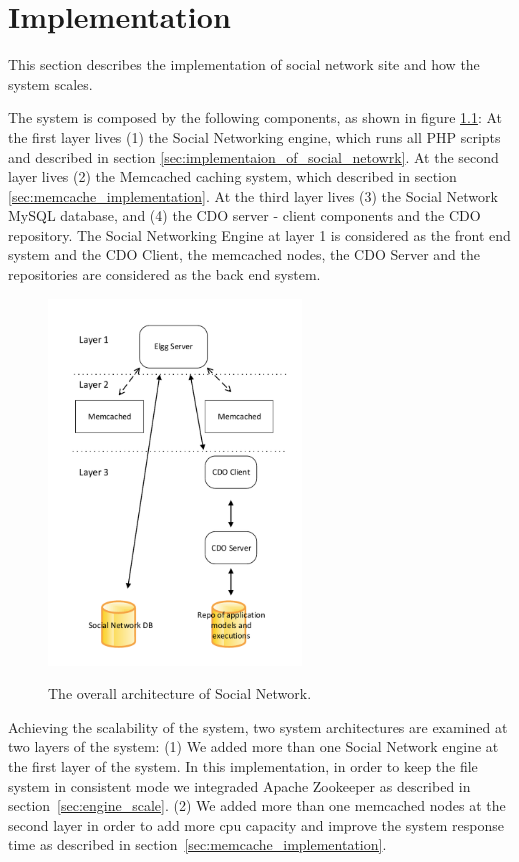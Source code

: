 
\chapter{Implementation}
\label{chap:implementation}
This section describes the implementation of social network site
and how the system scales.

The system is composed by the following components, as shown in figure \ref{fig:system_architecture}: At the first layer lives (1) the Social Networking engine, which runs all PHP scripts and described in section \ref{sec:implementaion_of_social_netowrk}. At the second layer lives (2) the Memcached caching system, which described in section \ref{sec:memcache_implementation}. At the third layer lives (3) the Social Network MySQL database, and (4) the CDO server - client components and the CDO repository. The Social Networking Engine at layer 1 is considered as the front end system and the CDO Client, the memcached nodes, the CDO Server and the repositories are considered as the back end system. 

\begin{figure}[h]
	\caption{The overall architecture of Social Network.}
	\includegraphics[width=0.6\textwidth,natwidth=200,natheight=150]{./fig/system_architecture.pdf}
	\centering
	\label{fig:system_architecture}
\end{figure}

Achieving the scalability of the system, two system architectures are examined at two layers of the system: (1) We added more than one Social Network engine at the first layer of the system. In this implementation, in order to keep the file system in consistent mode we integraded Apache Zookeeper\cite{zookeeper_url} as described in section~\ref{sec:engine_scale}. (2) We added more than one memcached nodes at the second layer in order to add more cpu capacity and improve the system response time as described in section~\ref{sec:memcache_implementation}.

